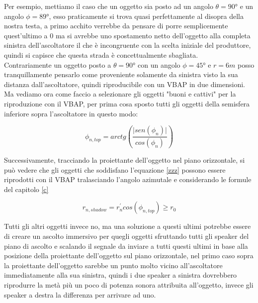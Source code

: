 \documentclass[12pt,a4paper]{report}
\begin{document}
Per esempio, mettiamo il caso che un oggetto sia posto ad un angolo $	\theta= 90° $ e un angolo $\phi=89°$, esso praticamente si trova quasi perfettamente al disopra della nostra testa, a primo acchito verrebbe da pensare di porre semplicemente quest'ultimo a $0$ ma si avrebbe uno spostamento netto dell'oggetto alla completa sinistra dell'ascoltatore il che è incongruente con la scelta iniziale del produttore, quindi si capisce che questa strada è concettualmente sbagliata.\\

Contrariamente un oggetto posto a $	\theta= 90° $ con un angolo $\phi=45°$ e $r=6m$ posso tranquillamente pensarlo come proveniente solamente da sinistra visto la sua distanza dall'ascoltatore, quindi riproducibile con un VBAP in due dimensioni.\\

Ma vediamo ora come faccio a selezionare gli oggetti "buoni e cattivi" per la riproduzione con il VBAP, per prima cosa sposto tutti gli oggetti della semisfera inferiore sopra l'ascoltatore in questo modo:

\begin{equation}
\phi_{n,top} = arctg  \left( \dfrac{\vert sen(\phi_n) \vert}{ cos(\phi_n) } \right)
\label{  b}
\end{equation}

Successivamente, tracciando la proiettante dell'oggetto nel piano orizzontale, si può vedere che gli oggetti che soddisfano l'equazione \ref{zzz} possono essere riprodotti con il VBAP tralasciando l'angolo azimutale e considerando le formule del capitolo \ref{c}

\begin{equation}
r_{n,shadow}=r_n^{\prime} cos(\phi_{n,top}) \geq r_0     
\label{zzz}
\end{equation}

Tutti gli altri oggetti invece no, ma una soluzione a questi ultimi potrebbe essere di creare un ascolto immersivo per quegli oggetti sfruttando tutti gli speaker del piano di ascolto e scalando il segnale da inviare a tutti questi ultimi in base alla posizione della proiettante dell'oggetto sul piano orizzontale, nel primo caso sopra la proiettante dell'oggetto sarebbe un punto molto vicino all'ascoltatore immediatamente alla sua sinistra, quindi i due speaker a sinistra dovrebbero riprodurre la metà più un poco di potenza sonora attribuita all'oggetto, invece gli speaker a destra la differenza per arrivare ad uno.\\
\end{document}
